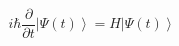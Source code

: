 \blindtext[4]

\begin{equation}
    i\hbar\frac{\partial}{\partial t}\left|\Psi(t)\right>=H\left|\Psi(t)\right>
\end{equation}

\blindtext \cite{lamport1994latex}
